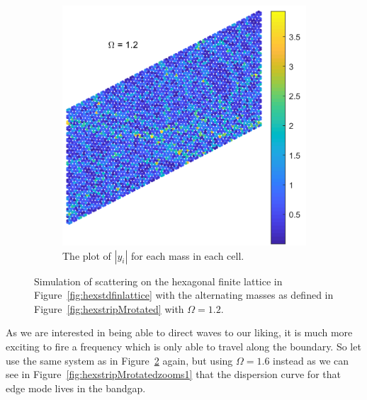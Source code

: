 \begin{figure}
\begin{subfigure}[b]{.5\textwidth}
  \includegraphics[width=1\linewidth]{imgs/hexstdrandscat.png}
  \caption{The plot of $|y_i|$ for each mass in each cell.}
  \label{fig:sub2}
\end{subfigure}
\caption{Simulation of scattering on the hexagonal finite lattice in
  Figure~\ref{fig:hexstdfinlattice} with the alternating masses as defined in
  Figure~\ref{fig:hexstripMrotated} with $\Omega = 1.2$.}
\label{fig:randscat}
\end{figure}

As we are interested in being able to direct waves to our liking, it is much
more exciting to fire a frequency which is only able to travel along the
boundary. So let use the same system as in Figure~\ref{fig:randscat} again, but
using $\Omega = 1.6$ instead as we can see in
Figure~\ref{fig:hexstripMrotatedzooms1} that the dispersion curve for that edge
mode lives in the bandgap.

